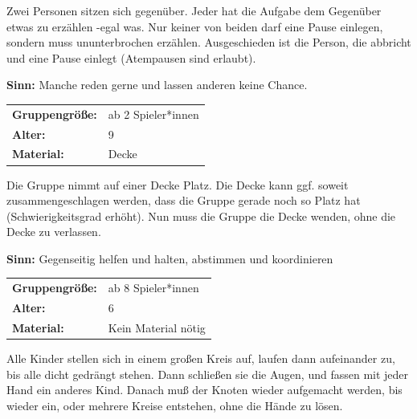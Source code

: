 Zwei Personen sitzen sich gegenüber. Jeder hat die Aufgabe dem Gegenüber etwas zu erzählen -egal was. Nur keiner von beiden darf eine Pause einlegen, sondern muss ununterbrochen erzählen. Ausgeschieden ist die Person, die abbricht und eine Pause einlegt (Atempausen sind erlaubt).

\textbf{Sinn:} Manche reden gerne und lassen anderen keine Chance.

\begin{table}[H]
\begin{tabular}{>{\bfseries}lp{8cm}}
  Gruppengröße:   & ab 2 Spieler*innen\\
    Alter: & 9 \\
    Material: &  Decke\\ 
\end{tabular}
\end{table} 
Die Gruppe nimmt auf einer Decke Platz. Die Decke kann ggf. soweit zusammengeschlagen werden, dass die Gruppe gerade noch so Platz hat (Schwierigkeitsgrad erhöht). Nun muss die Gruppe die Decke wenden, ohne die Decke zu verlassen.

\textbf{Sinn:} Gegenseitig helfen und halten, abstimmen und koordinieren

\begin{table}[H]
\begin{tabular}{>{\bfseries}lp{8cm}}
   Gruppengröße:   & ab 8 Spieler*innen\\
    Alter: & 6 \\
    Material: & Kein Material nötig \\ 
\end{tabular}
\end{table} 


Alle Kinder stellen sich in einem großen Kreis auf, laufen dann aufeinander zu, bis alle dicht gedrängt stehen. Dann schließen sie die Augen, und fassen mit jeder Hand ein anderes Kind. Danach muß der Knoten wieder aufgemacht werden, bis wieder ein, oder mehrere Kreise entstehen, ohne die Hände zu lösen.

